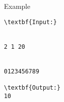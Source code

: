 Example
\begin{verbatim}
\textbf{Input:}


2 1 20


0123456789

\textbf{Output:}
10








\end{verbatim}
